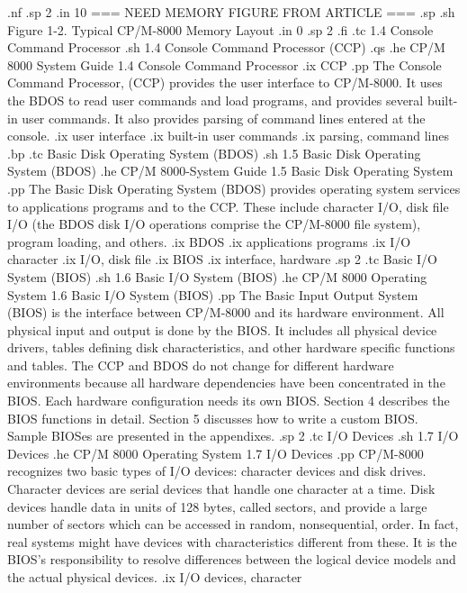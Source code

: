 .nf
.sp 2
.in 10
	     === NEED MEMORY FIGURE FROM ARTICLE ===
.sp
.sh
Figure 1-2.  Typical CP/M-8000 Memory Layout 
.in 0
.sp 2
.fi
.tc    1.4  Console Command Processor
.sh
1.4  Console Command Processor (CCP)
.qs
.he CP/M 8000 System Guide              1.4  Console Command Processor 
.ix CCP
.pp
The Console Command Processor, (CCP) provides the user interface to
CP/M-8000.  It uses the BDOS to read user commands and load programs,
and provides several built-in user commands.  It also provides
parsing of command lines entered at the console.   
.ix user interface
.ix built-in user commands
.ix parsing, command lines
.bp
.tc    Basic Disk Operating System (BDOS)
.sh
1.5  Basic Disk Operating System (BDOS)
.he CP/M 8000-System Guide            1.5  Basic Disk Operating System
.pp
The Basic Disk Operating System (BDOS) provides operating system services to
applications programs and to the CCP.  These include character I/O,
disk file I/O (the BDOS disk I/O operations comprise the CP/M-8000 file
system), program loading, and others.  
.ix BDOS
.ix applications programs
.ix I/O character
.ix I/O, disk file
.ix BIOS
.ix interface, hardware
.sp 2
.tc    Basic I/O System (BIOS)
.sh
1.6  Basic I/O System (BIOS)
.he CP/M 8000 Operating System            1.6  Basic I/O System (BIOS)  
.pp
The Basic Input Output System (BIOS) is the interface between CP/M-8000 and its
hardware environment.  All physical input and output is done by the
BIOS.  It includes all physical device drivers, tables defining disk
characteristics, and other hardware specific functions and tables.  The 
CCP and BDOS do not change for different hardware environments because
all hardware dependencies have been concentrated in the BIOS.  Each hardware 
configuration needs its own BIOS.  Section 4 describes the BIOS functions in 
detail.  Section 5 discusses how to write a custom BIOS.  Sample BIOSes are 
presented in the appendixes. 
.sp 2
.tc    I/O Devices
.sh
1.7  I/O Devices
.he CP/M 8000 Operating System                        1.7  I/O Devices
.pp
CP/M-8000 recognizes two basic types of I/O devices:
character devices and disk drives.  Character devices are serial devices that 
handle one character at a time.  Disk devices handle data in units of 128 
bytes, called sectors, and provide a large number of sectors which can be 
accessed in random, nonsequential, order.  In fact, real systems might have 
devices with characteristics different from these.  It is the BIOS's 
responsibility to resolve differences between the logical device models and 
the actual physical devices.
.ix I/O devices, character
